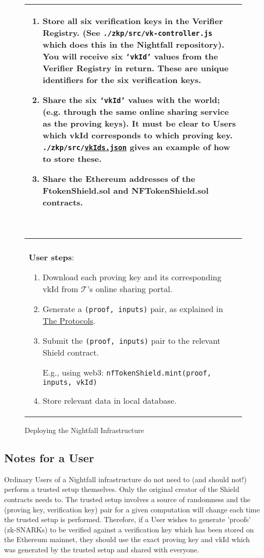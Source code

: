 \begin{figure}[ht]
\begin{center}
\begin{framed}
\begin{tabular}{p{16cm}}
\begin{enumerate}
          \item Store all six verification keys in the Verifier Registry. (See \texttt{./zkp/src/vk-controller.js} which does this in the Nightfall repository). You will receive six \texttt{`vkId'} values from the Verifier Registry in return. These are unique identifiers for the six verification keys.
          \item Share the six \texttt{`vkId'} values with the world; (e.g. through the same online sharing service as the proving keys). It must be clear to Users which vkId corresponds to which proving key. \texttt{./zkp/src/\hyperref[sec:zkp]{vkIds.json}} gives an example of how to store these.
          \item Share the Ethereum addresses of the FtokenShield.sol and NFTokenShield.sol contracts.
          
          \setcounter{ongoingEnumCounter}{\value{enumi}}
        \end{enumerate}
        \ \\
        \midrule \\
        \textbf{User steps}:
        \begin{enumerate}
          \setcounter{enumi}{\value{ongoingEnumCounter}}
          \item Download each proving key and its corresponding vkId from $\mathcal{T}$'s online sharing portal.
          \item Generate a \texttt{(proof, inputs)} pair, as explained in \hyperref[part:theProtocols]{The Protocols}.
          \item Submit the \texttt{(proof, inputs)} pair to the relevant Shield contract.
          
          E.g., using web3: \texttt{nfTokenShield.mint(proof, inputs, vkId)}
          \item Store relevant data in local database.
          \setcounter{ongoingEnumCounter}{0}
        \end{enumerate}
			\end{tabular}
		\end{framed}
	\end{center}
\caption{Deploying the Nightfall Infrastructure}
\label{fig:trustedSetup}
\end{figure}


\subsection*{Notes for a User}
Ordinary Users of a Nightfall infrastructure do not need to (and should not!) perform a trusted setup themselves. Only the original creator of the Shield contracts needs to.
The trusted setup involves a source of randomness and the (proving key, verification key) pair for a given computation will change each time the trusted setup is performed.
Therefore, if a User wishes to generate 'proofs' (zk-SNARKs) to be verified against a verification key which has been stored on the Ethereum mainnet, they should use the exact proving key and vkId which was generated by the trusted setup and shared with everyone.

